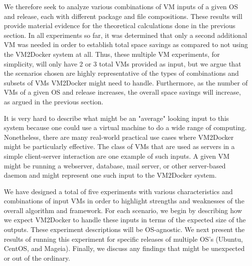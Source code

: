 We therefore seek to analyze various combinations of VM inputs of a given OS and release, each with different package and file compositions. These results will provide material evidence for the theoretical calculations done in the previous section. In all experiments so far, it was determined that only a second additional VM was needed in order to establish total space savings as compared to not using the VM2Docker system at all. Thus, these multiple VM experiments, for simplicity, will only have 2 or 3 total VMs provided as input, but we argue that the scenarios chosen are highly representative of the types of combinations and subsets of VMs VM2Docker might need to handle. Furthermore, as the number of VMs of a given OS and release increases, the overall space savings will increase, as argued in the previous section.

It is very hard to describe what might be an "average" looking input to this system because one could use a virtual machine to do a wide range of computing. Nonetheless, there are many real-world practical use cases where VM2Docker might be particularly effective. The class of VMs that are used as servers in a simple client-server interaction are one example of such inputs. A given VM might be running a webserver, database, mail server, or other server-based daemon and might represent one such input to the VM2Docker system. 

We have designed a total of five experiments with various characteristics and combinations of input VMs in order to highlight strengths and weaknesses of the overall algorithm and framework. For each scenario, we begin by describing how we expect VM2Docker to handle these inputs in terms of the expected size of the outputs. These experiment descriptions will be OS-agnostic. We next present the results of running this experiment for specific releases of multiple OS's (Ubuntu, CentOS, and Mageia). Finally, we discuss any findings that might be unexpected or out of the ordinary.

